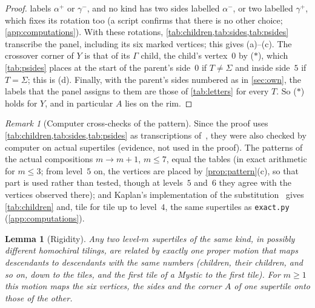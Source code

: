 \documentclass[11pt]{amsart}
\newtheorem{lemma}[theorem]{Lemma}
\theoremstyle{definition}
\theoremstyle{remark}
\newtheorem{remark}[theorem]{Remark}
\newcommand{\code}[1]{\texttt{#1}}
\begin{document}
\begin{proof}
labels $\alpha^+$ or $\gamma^-$, and no kind has two sides labelled $\alpha^-$, or two labelled $\gamma^+$, which fixes
its rotation too (a script confirms that there is no other choice; \cref{app:computations}). With these rotations,
\cref{tab:children,tab:sides,tab:psides} transcribe the panel, including its six marked vertices; this gives (a)--(c).
The crossover corner of $Y$ is that of its $\Gamma$ child, the child's vertex~$0$ by ($\ast$), which \cref{tab:psides}
places at the start of the parent's side~$0$ if $T\neq\Sigma$ and inside side~$5$ if $T=\Sigma$; this is (d). Finally,
with the parent's sides numbered as in \cref{sec:own}, the labels that the panel assigns to them are those of
\cref{tab:letters} for every $T$. So ($\ast$) holds for $Y$, and in particular $A$ lies on the rim.
\end{proof}

\begin{remark}[Computer cross-checks of the pattern]\label{rem:patterncheck}
Since the proof uses \cref{tab:children,tab:sides,tab:psides} as transcriptions of~\cite[Fig.~5.1]{SMKGS-spectre},
they were also checked by computer on actual supertiles (evidence, not used in the proof). The patterns of the actual
compositions $m\to m+1$, $m\le7$, equal the tables (in exact arithmetic for $m\le3$; from level~$5$ on, the vertices are
placed by \cref{prop:pattern}(c), so that part is used rather than tested, though at levels~$5$ and~$6$ they agree with
the vertices observed there); and Kaplan's implementation of
the substitution~\cite{KaplanSpectrePage} gives \cref{tab:children} and, tile for tile up to level~$4$, the same
supertiles as \code{exact.py} (\cref{app:computations}).
\end{remark}

\begin{lemma}[Rigidity]\label{lem:rigid}
Any two level-$m$ supertiles of the same kind, in possibly different homochiral tilings, are related by exactly one
proper motion that maps descendants to descendants with the same numbers (children, their children, and so on, down
to the tiles, and the first tile of a Mystic to the first tile). For $m\ge1$ this motion maps the six vertices, the sides and the corner $A$ of one supertile onto those
of the other.
\end{lemma}
\end{document}
